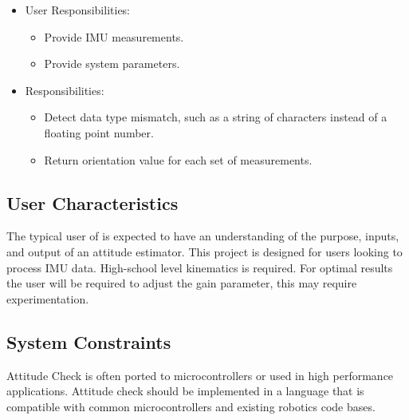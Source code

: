 \documentclass[12pt]{article}
\begin{document}
\begin{itemize}
    \item User Responsibilities:
\begin{itemize}
    \item Provide IMU measurements.
    \item Provide system parameters.
\end{itemize}
    \item \progname{} Responsibilities:
\begin{itemize}
    \item Detect data type mismatch, such as a string of characters instead of a floating point
  number.
    \item Return orientation value for each set of measurements.
\end{itemize}
\end{itemize}

\subsection{User Characteristics} \label{SecUserCharacteristics}

The typical user of \progname{} is expected to have an understanding of the purpose, inputs, and
output of an attitude estimator. This project is designed for users looking to process IMU data.
High-school level kinematics is required. For optimal results the user will be required to adjust
the gain parameter, this may require experimentation.


\subsection{System Constraints}

Attitude Check is often ported to microcontrollers or used in high performance applications.
Attitude check should be implemented in a language that is compatible with common microcontrollers
and existing robotics code bases.
\end{document}
